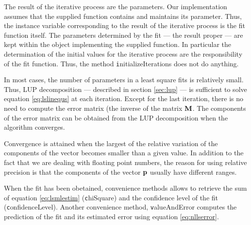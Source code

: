 The result of the iterative process are the parameters. Our
implementation assumes that the supplied function contains and
maintains its parameter. Thus, the instance variable corresponding
to the result of the iterative process is the fit function itself.
The parameters determined by the fit --- the result proper --- are
kept within the object implementing the supplied function. In
particular the determination of the initial values for the
iterative process are the responsibility of the fit function.
Thus, the method {\texttt initializeIterations} does not do anything.

In most cases, the number of parameters in a least square fits is
relatively small. Thus, LUP decomposition --- described in section
\ref{sec:lup} --- is sufficient to solve equation
\ref{eq:lslinequs} at each iteration. Except for the last
iteration, there is no need to compute the error matrix (the
inverse of the matrix ${\textbf M}$. The components of the error
matrix can be obtained from the LUP decomposition when the
algorithm converges.

Convergence is attained when the largest of the relative variation
of the components of the vector becomes smaller than a given
value. In addition to the fact that we are dealing with floating
point numbers, the reason for using relative precision is that the
components of the vector ${\textbf p}$ usually have different ranges.

When the fit has been obetained, convenience methods allows to
retrieve the sum of equation \ref{eq:lsmlestim} ({\texttt chiSquare})
and the confidence level of the fit ({\texttt confidenceLevel}).
Another convenience method, {\texttt valueAndError} computes the
prediction of the fit and its estimated error using equation
\ref{eq:nllserror}.

